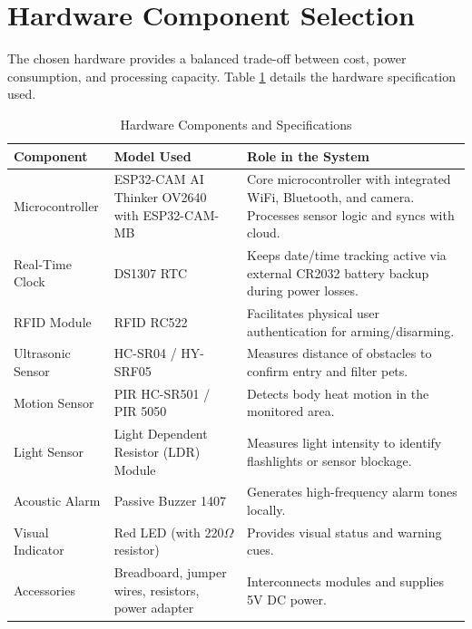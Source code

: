 \documentclass[11pt,a4paper]{report}
\begin{document}
\section{Hardware Component Selection}
The chosen hardware provides a balanced trade-off between cost, power consumption, and processing capacity. Table \ref{tab:hardware} details the hardware specification used.
\begin{table}[H]
\centering
\caption{Hardware Components and Specifications}
\label{tab:hardware}
\begin{tabular}{lp{6cm}p{6cm}}
    \toprule
    \textbf{Component} & \textbf{Model Used} & \textbf{Role in the System} \\
    \midrule
    Microcontroller & ESP32-CAM AI Thinker OV2640 with ESP32-CAM-MB & Core microcontroller with integrated WiFi, Bluetooth, and camera. Processes sensor logic and syncs with cloud. \\
    Real-Time Clock & DS1307 RTC & Keeps date/time tracking active via external CR2032 battery backup during power losses. \\
    RFID Module & RFID RC522 & Facilitates physical user authentication for arming/disarming. \\
    Ultrasonic Sensor & HC-SR04 / HY-SRF05 & Measures distance of obstacles to confirm entry and filter pets. \\
    Motion Sensor & PIR HC-SR501 / PIR 5050 & Detects body heat motion in the monitored area. \\
    Light Sensor & Light Dependent Resistor (LDR) Module & Measures light intensity to identify flashlights or sensor blockage. \\
    Acoustic Alarm & Passive Buzzer 1407 & Generates high-frequency alarm tones locally. \\
    Visual Indicator & Red LED (with 220$\Omega$ resistor) & Provides visual status and warning cues. \\
    Accessories & Breadboard, jumper wires, resistors, power adapter & Interconnects modules and supplies 5V DC power. \\
    \bottomrule
\end{tabular}
\end{table}
\end{document}
